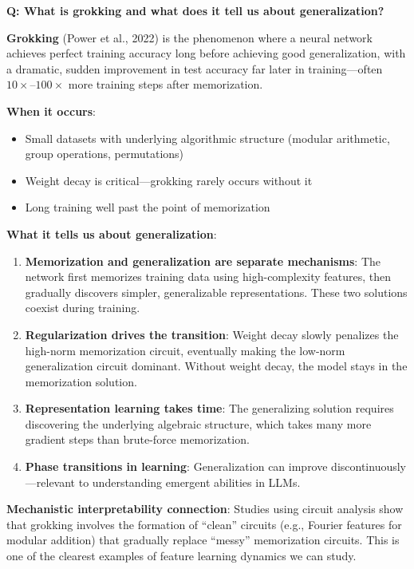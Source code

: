 \begin{interviewq}
\textbf{Q: What is grokking and what does it tell us about generalization?}

 \quad {} \quad \badgefreq{\freqmed}

\stronganswer
\textbf{Grokking} (Power et al., 2022) is the phenomenon where a neural network achieves perfect training accuracy long before achieving good generalization, with a dramatic, sudden improvement in test accuracy far later in training---often $10\times$--$100\times$ more training steps after memorization.

\textbf{When it occurs}:
\begin{itemize}
    \item Small datasets with underlying algorithmic structure (modular arithmetic, group operations, permutations)
    \item Weight decay is critical---grokking rarely occurs without it
    \item Long training well past the point of memorization
\end{itemize}

\textbf{What it tells us about generalization}:
\begin{enumerate}
    \item \textbf{Memorization and generalization are separate mechanisms}: The network first memorizes training data using high-complexity features, then gradually discovers simpler, generalizable representations. These two solutions coexist during training.
    \item \textbf{Regularization drives the transition}: Weight decay slowly penalizes the high-norm memorization circuit, eventually making the low-norm generalization circuit dominant. Without weight decay, the model stays in the memorization solution.
    \item \textbf{Representation learning takes time}: The generalizing solution requires discovering the underlying algebraic structure, which takes many more gradient steps than brute-force memorization.
    \item \textbf{Phase transitions in learning}: Generalization can improve discontinuously---relevant to understanding emergent abilities in LLMs.
\end{enumerate}

\textbf{Mechanistic interpretability connection}: Studies using circuit analysis show that grokking involves the formation of ``clean'' circuits (e.g., Fourier features for modular addition) that gradually replace ``messy'' memorization circuits. This is one of the clearest examples of feature learning dynamics we can study.


\end{interviewq}
